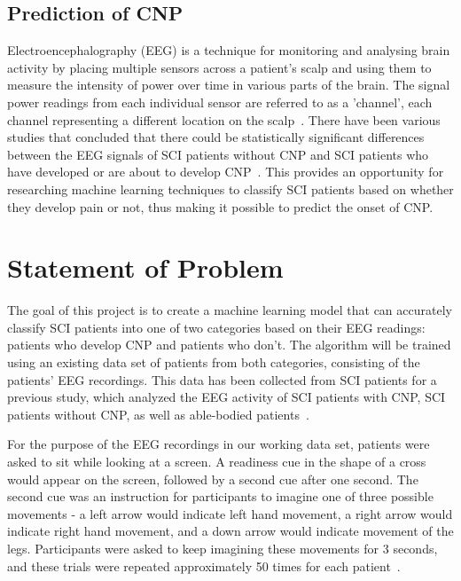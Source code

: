 \documentclass{mprop}
\begin{document}
\subsection{Prediction of CNP}

Electroencephalography (EEG) is a technique for monitoring and analysing brain activity by placing multiple sensors across a patient's scalp and using them to measure the intensity of power over time in various parts of the brain. The signal power readings from each individual sensor are referred to as a 'channel', each channel representing a different location on the scalp~\cite{noauthor_multi-channel_nodate}. There have been various studies that concluded that there could be statistically significant differences between the EEG signals of SCI patients without CNP and SCI patients who have developed or are about to develop CNP~\cite{vuckovic_prediction_2018}. This provides an opportunity for researching machine learning techniques to classify SCI patients based on whether they develop pain or not, thus making it possible to predict the onset of CNP.

\section{Statement of Problem}

The goal of this project is to create a machine learning model that can accurately classify SCI patients into one of two categories based on their EEG readings: patients who develop CNP and patients who don't. The algorithm will be trained using an existing data set of patients from both categories, consisting of the patients' EEG recordings. This data has been collected from SCI patients for a previous study, which analyzed the EEG activity of SCI patients with CNP, SCI patients without CNP, as well as able-bodied patients~\cite{vuckovic_dynamic_2014}.

For the purpose of the EEG recordings in our working data set, patients were asked to sit while looking at a screen. A readiness cue in the shape of a cross would appear on the screen, followed by a second cue after one second. The second cue was an instruction for participants to imagine one of three possible movements - a left arrow would indicate left hand movement, a right arrow would indicate right hand movement, and a down arrow would indicate movement of the legs. Participants were asked to keep imagining these movements for 3 seconds, and these trials were repeated approximately 50 times for each patient~\cite{vuckovic_dynamic_2014}.
\end{document}
